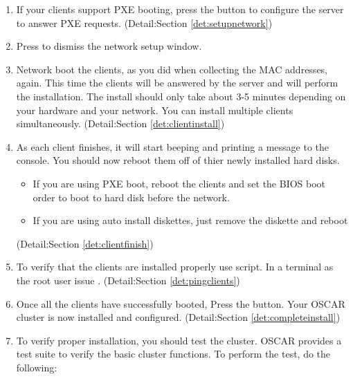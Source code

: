 \begin {enumerate}
\item If your clients support PXE booting, press the  
button to configure the server to answer PXE requests.
(Detail:Section \ref{det:setupnetwork})

\item Press  to dismiss the network setup window.

\item Network boot the clients, as you did when collecting the MAC addresses,
again. This time the clients will be answered by the server and will perform
the installation. The install should only take about 3-5 minutes depending on 
your hardware and your network. You can install multiple clients simultaneously.
(Detail:Section \ref{det:clientinstall})

\item As each client finishes, it will start beeping and printing a message to the 
console. You should now reboot them off of thier newly installed hard disks.

        \begin{itemize}
        \item If you are using PXE boot, reboot the clients and set the BIOS
        boot order to boot to hard disk before the network.
        \item If you are using auto install diskettes, just remove the diskette
        and reboot
        \end{itemize}
(Detail:Section \ref{det:clientfinish})

\item To verify that the clients are installed properly use
   script.  In a terminal as the root user issue
  .
  (Detail:Section \ref{det:pingclients})

\item Once all the clients have successfully booted, Press the 
 button. Your OSCAR cluster is
now installed and configured.
(Detail:Section \ref{det:completeinstall})

\item To verify proper installation, you should test the cluster.
OSCAR provides a test suite to verify the basic cluster
functions. To perform the test, do the following:


\end{enumerate}
